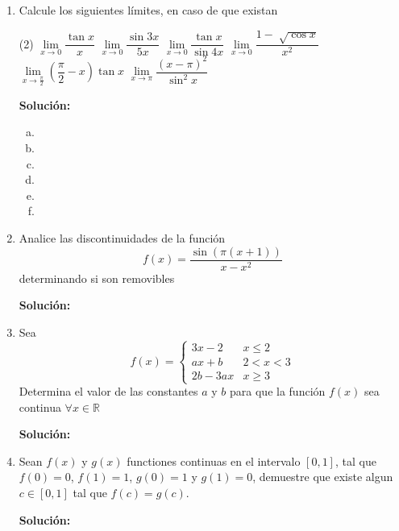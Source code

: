 \documentclass[12pt]{article}
\newenvironment{solucion}
{\begin{mdframed}[backgroundcolor=black!10]
		{\bf Solución:}\\
	}
	{
	\end{mdframed}
}
\newenvironment{preguntas}
{\begin{enumerate}\itemsep12pt
	}
	{
	\end{enumerate}
}
\newcommand{\ra}{\rightarrow}
\newcommand{\R}{\mathbb{R}}
\begin{document}
\begin{preguntas}
\item Calcule los siguientes límites, en caso de que existan
\begin{tasks}(2)
\task $\lim\limits_{x \ra 0} \dfrac{\tan x}{x}$ 
\task $\lim\limits_{x \ra 0} \dfrac{\sin 3x}{5x}$ 
\task $\lim\limits_{x \ra 0} \dfrac{\tan x}{\sin 4x}$ 
\task $\lim\limits_{x \ra 0} \dfrac{1 - \sqrt[]{\cos x}}{x^2}$ 
\task $\lim\limits_{x \ra \frac{\pi}{2}} \left(\dfrac{\pi}{2} - x \right) \tan x$ 
\task $\lim\limits_{x \ra \pi} \dfrac{(x - \pi)^2}{\sin ^2 x}$ 
\end{tasks}
\begin{solucion}

\begin{enumerate}[a)]
\item 
\item 
\item 
\item 
\item 
\item 
\end{enumerate}
\end{solucion}
\item Analice las discontinuidades de la función
$$ f(x) = \dfrac{\sin(\pi(x+1))}{x-x^2} $$
determinando si son removibles
\begin{solucion}

\end{solucion}
\item Sea 
$$f(x) = \begin{cases}
3x - 2 & x \leq 2\\
ax+b & 2 < x < 3 \\
2b-3ax & x \geq 3
\end{cases}$$
Determina el valor de las constantes $a$ y $b$ para que la función $f(x)$ sea continua $\forall x \in \R$
\begin{solucion}

\end{solucion}
\item Sean $f(x)$ y $g(x)$ functiones continuas en el intervalo $[0, 1]$, tal que $f(0)=0$, $f(1)=1$, $g(0)=1$ y $g(1)=0$, demuestre que existe algun $c \in [0,1]$ tal que $f(c) = g(c)$.
\begin{solucion}

\end{solucion}
\end{preguntas}
\end{document}
